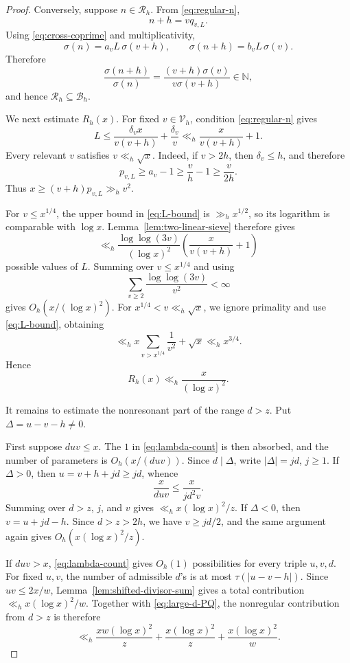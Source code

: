 \documentclass[11pt,reqno]{amsart}
\numberwithin{equation}{section}
\theoremstyle{plain}
\theoremstyle{definition}
\theoremstyle{remark}
\newcommand{\N}{\mathbb N}
\begin{document}
\begin{proof}
Conversely, suppose $n\in\mathcal R_h$. From \eqref{eq:regular-n},
\[
n+h=vq_{v,L}.
\]
Using \eqref{eq:cross-coprime} and multiplicativity,
\[
\sigma(n)=a_vL\,\sigma(v+h),
\qquad
\sigma(n+h)=b_vL\,\sigma(v).
\]
Therefore
\[
\frac{\sigma(n+h)}{\sigma(n)}
=
\frac{(v+h)\sigma(v)}{v\sigma(v+h)}
\in\N,
\]
and hence $\mathcal R_h\subseteq\mathcal B_h$.

We next estimate $R_h(x)$. For fixed $v\in\mathcal V_h$, condition \eqref{eq:regular-n} gives
\begin{equation}\label{eq:L-bound}
L\le\frac{\delta_vx}{v(v+h)}+\frac{\delta_v}{v}
\ll_h\frac{x}{v(v+h)}+1.
\end{equation}
Every relevant $v$ satisfies $v\ll_h\sqrt x$. Indeed, if $v>2h$, then $\delta_v\le h$, and therefore
\[
p_{v,L}\ge a_v-1\ge\frac vh-1\ge\frac{v}{2h}.
\]
Thus $x\ge(v+h)p_{v,L}\gg_hv^2$.

For $v\le x^{1/4}$, the upper bound in \eqref{eq:L-bound} is $\gg_hx^{1/2}$, so its logarithm is comparable with $\log x$. Lemma~\ref{lem:two-linear-sieve} therefore gives
\[
\ll_h
\frac{\log\log(3v)}{(\log x)^2}
\left(\frac{x}{v(v+h)}+1\right)
\]
possible values of $L$. Summing over $v\le x^{1/4}$ and using
\[
\sum_{v\ge2}\frac{\log\log(3v)}{v^2}<\infty
\]
gives $O_h(x/(\log x)^2)$. For $x^{1/4}<v\ll_h\sqrt x$, we ignore primality and use \eqref{eq:L-bound}, obtaining
\[
\ll_h x\sum_{v>x^{1/4}}\frac1{v^2}+\sqrt x\ll_hx^{3/4}.
\]
Hence
\begin{equation}\label{eq:Rh-bound}
R_h(x)\ll_h\frac{x}{(\log x)^2}.
\end{equation}

It remains to estimate the nonresonant part of the range $d>z$. Put $\Delta=u-v-h\ne0$.

First suppose $duv\le x$. The $1$ in \eqref{eq:lambda-count} is then absorbed, and the number of parameters is $O_h(x/(duv))$. Since $d\mid\Delta$, write $|\Delta|=jd$, $j\ge1$.
If $\Delta>0$, then $u=v+h+jd\ge jd$, whence
\[
\frac{x}{duv}\le\frac{x}{jd^2v}.
\]
Summing over $d>z$, $j$, and $v$ gives $\ll_hx(\log x)^2/z$. If $\Delta<0$, then $v=u+jd-h$. Since $d>z>2h$, we have $v\ge jd/2$, and the same argument again gives $O_h(x(\log x)^2/z)$.

If $duv>x$, \eqref{eq:lambda-count} gives $O_h(1)$ possibilities for every triple $u,v,d$. For fixed $u,v$, the number of admissible $d$'s is at most $\tau(|u-v-h|)$. Since $uv\le2x/w$, Lemma~\ref{lem:shifted-divisor-sum} gives a total contribution $\ll_hx(\log x)^2/w$. Together with \eqref{eq:large-d-PQ}, the nonregular contribution from $d>z$ is therefore
\begin{equation}\label{eq:large-d-nonregular}
\ll_h
\frac{xw(\log x)^2}{z}
+
\frac{x(\log x)^2}{z}
+
\frac{x(\log x)^2}{w}.
\end{equation}


\end{proof}
\end{document}

